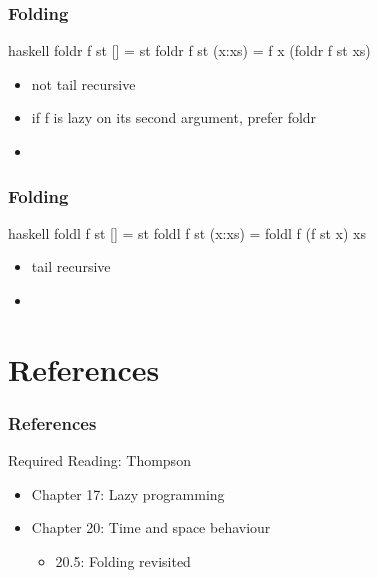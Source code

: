 \documentclass[dvipsnames]{beamer}
\theoremstyle{plain}
\begin{document}
\begin{frame}[fragile]
  \frametitle{Folding}

  \begin{exampleblock}{}
    \begin{pygments}{haskell}
foldr f st []     = st
foldr f st (x:xs) = f x (foldr f st xs)
    \end{pygments}
  \end{exampleblock}

  \begin{itemize}
    \item not tail recursive
    \item if f is lazy on its second argument, prefer foldr
    \item {}
  \end{itemize}
\end{frame}

\begin{frame}[fragile]
  \frametitle{Folding}

  \begin{exampleblock}{}
    \begin{pygments}{haskell}
foldl f st []     = st
foldl f st (x:xs) = foldl f (f st x) xs
    \end{pygments}
  \end{exampleblock}

  \begin{itemize}
    \item tail recursive
    \item {}
  \end{itemize}
\end{frame}

\section*{References}

\begin{frame}
  \frametitle{References}

  \begin{block}{Required Reading: Thompson}
    \begin{itemize}
      \item Chapter 17: \alert{Lazy programming}
      \item Chapter 20: Time and space behaviour
      \begin{itemize}
        \item 20.5: \alert{Folding revisited}
      \end{itemize}
    \end{itemize}
  \end{block}
\end{frame}
\end{document}

